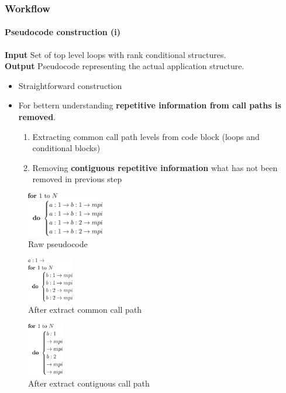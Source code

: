 \documentclass{beamer}
\begin{document}
\begin{frame}
\frametitle{Workflow}
\framesubtitle{Pseudocode construction (i)}
\textbf{Input} Set of top level loops with rank conditional structures.\\
\textbf{Output} Pseudocode representing the actual application structure. \\
\vspace{5px}
\pause
\begin{itemize}
	\item Straightforward construction
	\item For bettern understanding \textbf{repetitive information from call paths is removed}.
	\begin{enumerate}
		\item Extracting common call path levels from code block (loops and conditional blocks)
		\item Removing \textbf{contiguous repetitive information} what has not been removed in previous step
	\end{enumerate}
\end{itemize}
\begin{multicols}{3}
	\begin{figure}
		\includegraphics[width=0.3\textwidth]{imgs/workflow_pseudocode_1.png}
		\caption{Raw pseudocode}
	\end{figure}
	\columnbreak
	\pause
	\begin{figure}
		\includegraphics[width=0.18\textwidth]{imgs/workflow_pseudocode_2.png}
		\caption{After extract common call path}	
	\end{figure}
	\columnbreak
	\pause
	\begin{figure}
		\includegraphics[width=0.14\textwidth]{imgs/workflow_pseudocode_3.png}
		\caption{After extract contiguous call path}
	\end{figure}
	\columnbreak
\end{multicols}
\end{frame}
\end{document}
